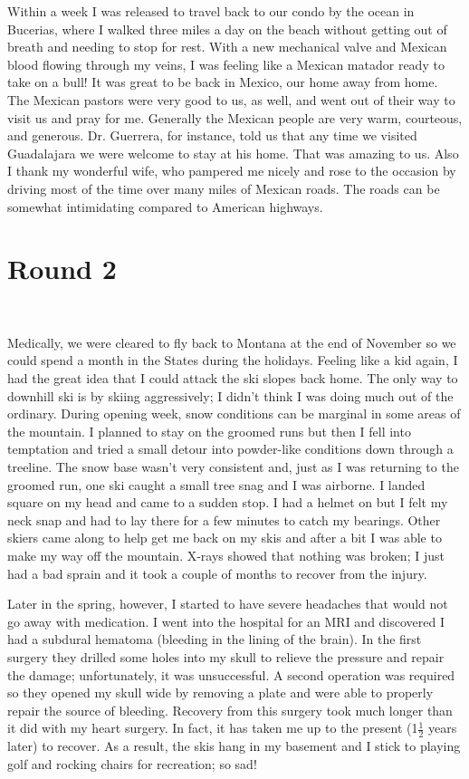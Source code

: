 \documentclass[oneside,12pt]{book}
\begin{document}
Within a week I was released to travel back to our condo by the ocean in Bucerias, where I walked three miles a day on the beach without getting out of breath and needing to stop for rest. With a new mechanical valve and Mexican blood flowing through my veins, I was feeling like a Mexican matador ready to take on a bull! It was great to be back in Mexico, our home away from home. The Mexican pastors were very good to us, as well, and went out of their way to visit us and pray for me. Generally the Mexican people are very warm, courteous, and generous. Dr. Guerrera, for instance, told us that any time we visited Guadalajara we were welcome to stay at his home. That was amazing to us. Also I thank my wonderful wife, who pampered me nicely and rose to the occasion by driving most of the time over many miles of Mexican roads. The roads can be somewhat intimidating compared to American highways. 


\section{Round 2}
\

Medically, we were cleared to fly back to Montana at the end of November so we could spend a month in the States during the holidays. Feeling like a kid again, I had the great idea that I could attack the ski slopes back home. The only way to downhill ski is by skiing aggressively; I didn't think I was doing much out of the ordinary. During opening week, snow conditions can be marginal in some areas of the mountain. I planned to stay on the groomed runs but then I fell into temptation and tried a small detour into powder-like conditions down through a treeline. The snow base wasn't very consistent and, just as I was returning to the groomed run, one ski caught a small tree snag and I was airborne. I landed square on my head and came to a sudden stop. I had a helmet on but I felt my neck snap and had to lay there for a few minutes to catch my bearings. Other skiers came along to help get me back on my skis and after a bit I was able to make my way off the mountain. X-rays showed that nothing was broken; I just had a bad sprain and it took a couple of months to recover from the injury. 

Later in the spring, however, I started to have severe headaches that would not go away with medication. I went into the hospital for an MRI and discovered I had a subdural hematoma (bleeding in the lining of the brain). In the first surgery they drilled some holes into my skull to relieve the pressure and repair the damage; unfortunately, it was unsuccessful. A second operation was required so they opened my skull wide by removing a plate and were able to properly repair the source of bleeding. Recovery from this surgery took much longer than it did with my heart surgery. In fact, it has taken me up to the present (1$\frac{1}{2}$ years later) to recover. As a result, the skis hang in my basement and I stick to playing golf and rocking chairs for recreation; so sad!
\end{document}
